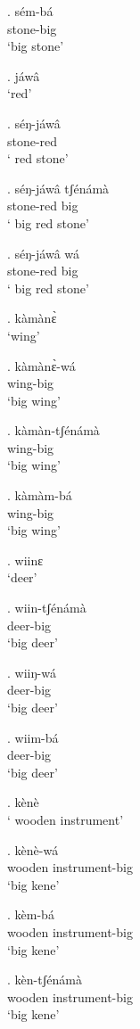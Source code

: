 \documentclass{assets/fieldnotes}
\begin{document}
\exg. sém-bá\\
stone-big\\
`big stone'

\ex. jáwâ\\
`red'

\exg. séŋ-jáwâ\\
stone-red\\
` red stone'

\ex. séŋ-jáwâ tʃénámà\\
stone-red big\\
` big red stone'

\ex. séŋ-jáwâ wá\\
stone-red big\\
` big red stone'

\ex. kàmànɛ̀\\
`wing'

\exg. kàmànɛ̀-wá\\
 wing-big\\
 `big wing'

 \exg. kàmàn-tʃénámà\\
 wing-big\\
 `big wing'

\exg. kàmàm-bá\\
 wing-big\\
 `big wing'

\ex. wiinɛ\\
`deer'

\exg. wiin-tʃénámà\\
deer-big\\
`big deer'

\exg. wiiŋ-wá\\
deer-big\\
`big deer'

\exg. wiim-bá\\
deer-big\\
`big deer'

\ex. kènè\\
` wooden instrument'

\exg. kènè-wá\\
wooden instrument-big\\
`big kene'

\exg. kèm-bá\\
wooden instrument-big\\
`big kene'

\exg. kèn-tʃénámà\\
wooden instrument-big\\
`big kene'

\end{document}
